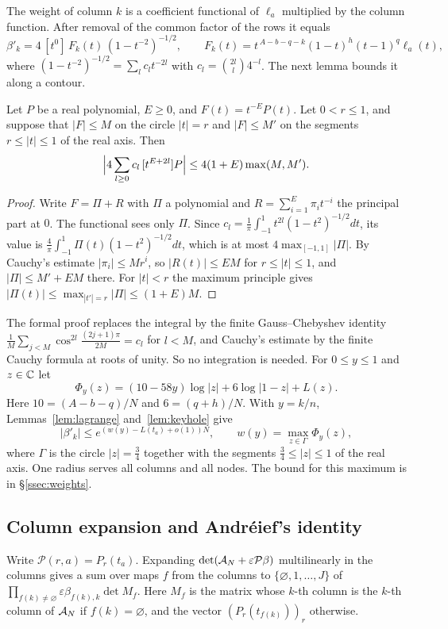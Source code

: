 The weight of column $k$ is a
coefficient functional of $\ell_a$ multiplied by the column function. After removal of the common factor of
the rows it equals
\[
 \beta'_k=4\,[t^0]\,F_k(t)\,(1-t^{-2})^{-1/2},\qquad F_k(t)=t^{\,A-b-q-k}(1-t)^h(t-1)^q\ell_a(t),
\]
where $(1-t^{-2})^{-1/2}=\sum_lc_lt^{-2l}$ with $c_l=\binom{2l}l4^{-l}$. The next lemma bounds it along a contour.

\begin{lemma}\label{lem:keyhole}
Let $P$ be a real polynomial, $E\ge0$, and $F(t)=t^{-E}P(t)$. Let $0<r\le1$, and suppose that $|F|\le M$ on
the circle $|t|=r$ and $|F|\le M'$ on the segments $r\le|t|\le1$ of the real axis. Then
\[
 \Bigl|4\sum_{l\ge0}c_l\,[t^{E+2l}]P\Bigr|\le4(1+E)\max(M,M').
\]
\end{lemma}

\begin{proof}
Write $F=\Pi+R$ with $\Pi$ a polynomial and $R=\sum_{i=1}^E\pi_it^{-i}$ the principal part at $0$. The
functional sees only $\Pi$. Since $c_l=\frac1\pi\int_{-1}^1t^{2l}(1-t^2)^{-1/2}dt$, its value is
$\frac4\pi\int_{-1}^1\Pi(t)(1-t^2)^{-1/2}dt$, which is at most $4\max_{[-1,1]}|\Pi|$. By Cauchy's estimate
$|\pi_i|\le Mr^i$, so $|R(t)|\le EM$ for $r\le|t|\le1$, and $|\Pi|\le M'+EM$ there. For $|t|<r$ the maximum
principle gives $|\Pi(t)|\le\max_{|t'|=r}|\Pi|\le(1+E)M$.
\end{proof}

The formal proof replaces the integral by the finite Gauss--Chebyshev identity
$\frac1M\sum_{j<M}\cos^{2l}\frac{(2j+1)\pi}{2M}=c_l$ for $l<M$, and Cauchy's estimate by the finite Cauchy formula
at roots of unity. So no integration is needed. For $0\le y\le1$ and $z\in\mathbb C$ let
\[
 \Phi_y(z)=(10-58y)\log|z|+6\log|1-z|+L(z).
\]
Here $10=(A-b-q)/N$ and $6=(q+h)/N$. With $y=k/n$, Lemmas~\ref{lem:lagrange} and~\ref{lem:keyhole} give
\begin{equation}\label{eq:wk}
 |\beta'_k|\le e^{(w(y)-L(t_a)+o(1))N},\qquad w(y)=\max_{z\in\Gamma}\Phi_y(z),
\end{equation}
where $\Gamma$ is the circle $|z|=\frac34$ together with the segments $\frac34\le|z|\le1$ of the real axis. One
radius serves all columns and all nodes. The bound for this maximum is in \S\ref{ssec:weights}.

\subsection{Column expansion and Andr\'eief's identity}\label{ssec:andreief}
Write $\mathcal P(r,a)=P_r(t_a)$. Expanding $\det(\mathcal A_N+\varepsilon\mathcal P\beta)$ multilinearly in the
columns gives a sum over maps $f$ from the columns to $\{\varnothing,1,\ldots,J\}$ of
$\prod_{f(k)\ne\varnothing}\varepsilon\beta_{f(k),k}\det M_f$. Here $M_f$ is the matrix whose $k$-th column is
the $k$-th column of $\mathcal A_N$ if $f(k)=\varnothing$, and the vector $(P_r(t_{f(k)}))_r$ otherwise.

